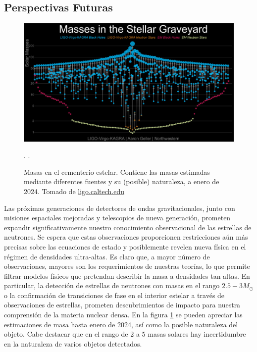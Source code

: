 \subsection{Perspectivas Futuras}

\begin{figure}[h]
	\centering
	\includegraphics[width=0.7\linewidth]{Figuras/ligo-virgo-graveyard}
	\caption{Masas en el cementerio estelar. Contiene las masas estimadas mediante diferentes fuentes y su (posible) naturaleza, a enero de 2024. Tomado de \href{https://www.ligo.caltech.edu/image/ligo20250826d}{ligo.caltech.edu}}.
	\label{fig:ligo-virgo-graveyard}.
\end{figure}

Las próximas generaciones de detectores de ondas gravitacionales, junto con misiones espaciales mejoradas y telescopios de nueva generación, prometen expandir significativamente nuestro conocimiento observacional de las estrellas de neutrones. Se espera que estas observaciones proporcionen restricciones aún más precisas sobre las ecuaciones de estado y posiblemente revelen nueva física en el régimen de densidades ultra-altas. Es claro que, a mayor número de observaciones, mayores son los requerimientos de nuestras teorías, lo que permite filtrar modelos físicos que pretendan describir la masa a densidades tan altas.
En particular, la detección de estrellas de neutrones con masas en el rango $2.5-3 M_\odot$ o la confirmación de transiciones de fase en el interior estelar a través de observaciones de estrellas, prometen descubrimientos de impacto para nuestra comprensión de la materia nuclear densa. En la figura \ref{fig:ligo-virgo-graveyard} se pueden apreciar las estimaciones de masa hasta enero de 2024, así como la posible naturaleza del objeto. Cabe destacar que en el rango de 2 a 5 masas solares hay incertidumbre en la naturaleza de varios objetos detectados.


